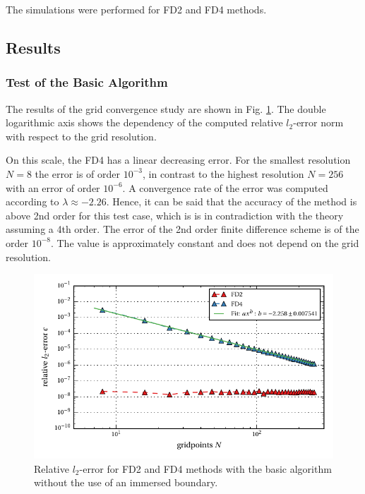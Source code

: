 The simulations were performed for FD2 and FD4 methods.

\clearpage

\subsection{Results}
\subsubsection{Test of the Basic Algorithm}

The results of the grid convergence study are shown in Fig. \ref{fig:ema1}.
The double logarithmic axis shows the dependency of the computed relative $l_2$-error norm
with respect to the grid resolution.

On this scale, the FD4 has a linear decreasing error.
For the smallest resolution $N=8$ the error is of order $10^{-3}$,
in contrast to the highest resolution $N=256$ with an error of order $10^{-6}$.
A convergence rate of the error  was computed  according to $\lambda\approx -2.26$.
Hence, it can be said that the accuracy of the method is above 2nd order for this test case,
which is is in contradiction with the theory assuming a 4th order.
The error of the 2nd order finite difference scheme is of the order $10^{-8}$.
The value is approximately constant and does not depend on the grid resolution.

\begin{figure}[!bp]
    \centering
    \includegraphics{gfx/immersed_boundary/poiseuille_flow/1_default/relative_l2error.pdf}
    \caption{Relative $l_2$-error for FD2 and FD4 methods with the basic algorithm without the use of an immersed boundary.\label{fig:ema1}}
\end{figure}


